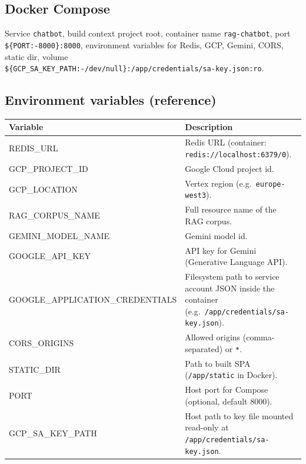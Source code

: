 \documentclass[11pt,a4paper]{article}
\begin{document}
\subsection{Docker Compose}

Service \texttt{chatbot}, build context project root, container name \texttt{rag-chatbot}, port \texttt{\$\{PORT:-8000\}:8000}, environment variables for Redis, GCP, Gemini, CORS, static dir, volume\\
\texttt{\$\{GCP\_SA\_KEY\_PATH:-/dev/null\}:/app/credentials/sa-key.json:ro}.

\subsection{Environment variables (reference)}

\begin{longtable}{@{}E F@{}}
\toprule
\textbf{Variable} & \textbf{Description} \\
\midrule
\endhead
\ttfamily\footnotesize REDIS\_URL\normalfont\normalsize & Redis URL (container: \texttt{redis://localhost:6379/0}). \\
\ttfamily\footnotesize GCP\_PROJECT\_ID\normalfont\normalsize & Google Cloud project id. \\
\ttfamily\footnotesize GCP\_LOCATION\normalfont\normalsize & Vertex region (e.g.\ \texttt{europe-west3}). \\
\ttfamily\footnotesize RAG\_CORPUS\_NAME\normalfont\normalsize & Full resource name of the RAG corpus. \\
\ttfamily\footnotesize GEMINI\_MODEL\_NAME\normalfont\normalsize & Gemini model id. \\
\ttfamily\footnotesize GOOGLE\_API\_KEY\normalfont\normalsize & API key for Gemini (Generative Language API). \\
\ttfamily\footnotesize GOOGLE\_APPLICATION\_\allowbreak CREDENTIALS\normalfont\normalsize & Filesystem path to service account JSON inside the container (e.g.\ \texttt{/app/credentials/sa-key.json}). \\
\ttfamily\footnotesize CORS\_ORIGINS\normalfont\normalsize & Allowed origins (comma-separated) or \texttt{*}. \\
\ttfamily\footnotesize STATIC\_DIR\normalfont\normalsize & Path to built SPA (\texttt{/app/static} in Docker). \\
\ttfamily\footnotesize PORT\normalfont\normalsize & Host port for Compose (optional, default 8000). \\
\ttfamily\footnotesize GCP\_SA\_KEY\_PATH\normalfont\normalsize & Host path to key file mounted read-only at \texttt{/app/credentials/sa-key.json}. \\
\bottomrule
\end{longtable}
\end{document}
